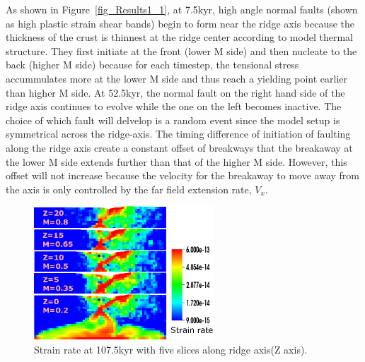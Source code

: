 As shown in Figure~\ref{fig_Results1_1}, at 7.5kyr, high angle normal faults (shown as high plastic strain shear bands) begin to form near the ridge axis because the thickness of the crust is thinnest at the ridge center according to model thermal structure. They first initiate at the front (lower M side) and then nucleate to the back (higher M side) because for each timestep, the tensional stress accummulates more at the lower M side and thus reach a yielding point earlier than higher M side. At 52.5kyr, the normal fault on the right hand side of the ridge axis continues to evolve while the one on the left becomes inactive. The choice of which fault will delvelop is a random event since the model setup is symmetrical across the ridge-axis. The timing difference of initiation of faulting along the ridge axis create a constant offset of breakways that the breakaway at the lower M side extends further than that of the higher M side. However, this offset will not increase because the velocity for the breakaway to move away from the axis is only controlled by the far field extension rate, $V_{x}$.

\begin{figure}[H]
  \centering
    \includegraphics[width=0.6\textwidth]{fig_Results1_2.eps}
  \caption{Strain rate at 107.5kyr with five slices along ridge axis(Z axis).}
 \label{fig_Results1_2}
\end{figure}   

